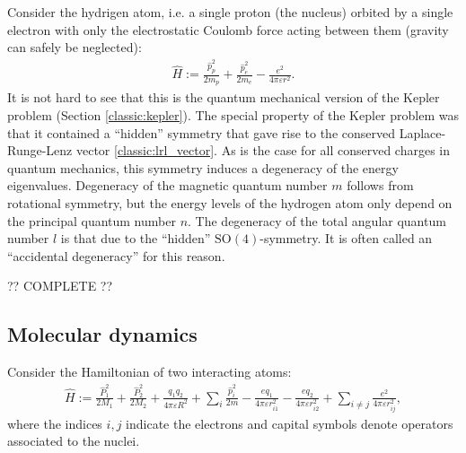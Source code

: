     Consider the hydrigen atom, i.e. a single proton (the nucleus) orbited by a single electron with only the electrostatic Coulomb force acting between them (gravity can safely be neglected):
    \begin{gather}
        \hat{H} := \frac{\hat{p}_p^2}{2m_p} + \frac{\hat{p}_e^2}{2m_e} - \frac{e^2}{4\pi\varepsilon r^2}.
    \end{gather}
    It is not hard to see that this is the quantum mechanical version of the Kepler problem (Section \ref{classic:kepler}). The special property of the Kepler problem was that it contained a ``hidden'' symmetry that gave rise to the conserved Laplace-Runge-Lenz vector \ref{classic:lrl_vector}. As is the case for all conserved charges in quantum mechanics, this symmetry induces a degeneracy of the energy eigenvalues. Degeneracy of the magnetic quantum number $m$ follows from rotational symmetry, but the energy levels of the hydrogen atom only depend on the principal quantum number $n$. The degeneracy of the total angular quantum number $l$ is that due to the ``hidden'' $\mathrm{SO}(4)$-symmetry. It is often called an ``accidental degeneracy'' for this reason.

    ?? COMPLETE ??

\subsection{Molecular dynamics}

    Consider the Hamiltonian of two interacting atoms:
    \begin{gather}
        \hat{H} := \frac{\hat{P}_1^2}{2M_1} + \frac{\hat{P}_2^2}{2M_2} + \frac{q_1q_2}{4\pi\varepsilon R^2} + \sum_i\frac{\hat{p}_i^2}{2m} - \frac{eq_1}{4\pi\varepsilon r_{i1}^2} - \frac{eq_2}{4\pi\varepsilon r_{i2}^2} + \sum_{i\neq j}\frac{e^2}{4\pi\varepsilon r_{ij}^2},
    \end{gather}
    where the indices $i,j$ indicate the electrons and capital symbols denote operators associated to the nuclei.

